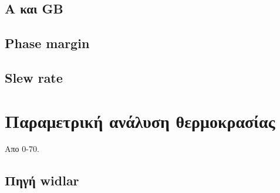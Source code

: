 \documentclass[12pt, a4paper]{article}
\begin{document}
\subsection{Α και GB}

\subsection{Phase margin}

\subsection{Slew rate}




\section{Παραμετρική ανάλυση θερμοκρασίας}

Απο 0-70.

\subsection{Πηγή widlar}
\end{document}
